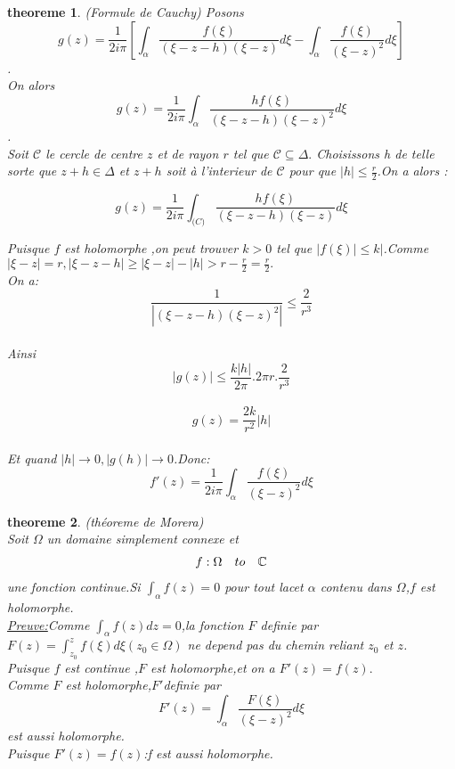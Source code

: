\documentclass[a4paper,12pt]{book}
\newtheorem{theoreme}{theoreme}[section]
\begin{document}
\begin{theoreme}{(Formule de Cauchy)}
			Posons $$g(z)=\frac{1}{2i\pi}[\int_{\alpha}\frac{f(\xi)}{(\xi -z-h)(\xi -z)}d\xi -\int_{\alpha}\frac{f(\xi)}{(\xi -z)^2}d\xi]$$.\\On alors $$g(z)=\frac{1}{2i\pi}\int_{\alpha}\frac{hf(\xi)}{(\xi -z -h)(\xi-z)^2}d\xi$$.\\Soit $\mathcal{C}$ le cercle de centre $z$ et de rayon $r$ tel que $\mathcal{C}\subseteq \Delta.$ Choisissons h de telle sorte que $z+h \in \Delta$ et $z+h$ soit à l'interieur de $\mathcal{C}$ pour que $ |h|\le \frac{r}{2}$.On a alors :
			\begin{center}
				$$g(z)=\frac{1}{2i\pi}\int_{\mathcal(C)}\frac{hf(\xi)}{(\xi -z -h)(\xi -z)}d\xi$$
			\end{center}Puisque $f$ est holomorphe ,on peut trouver $k>0$ tel que $ |f(\xi)|\le k|$.Comme $|\xi-z|=r,|\xi-z-h|\ge|\xi -z|-|h|>r-\frac{r}{2}=\frac{r}{2}.$\\On a:$$\frac{1}{|(\xi-z-h)(\xi-z)^2|}\le \frac{2}{r^3}$$\\Ainsi $$|g(z)|\le \frac{k|h|}{2\pi}.2\pi r .\frac{2}{r^3}$$\\
	$$g(z)=\frac{2k}{r^2}|h|$$\\Et quand $|h| \to 0,|g(h)| \to 0$.Donc:\\$$f'(z)=\frac{1}{2i\pi}\int_{\alpha}\frac{f(\xi)}{(\xi -z)^2}d\xi$$		
\end{theoreme}
\begin{theoreme}{(théoreme de Morera)}\\
	Soit $\Omega$ un domaine simplement connexe et
	\[
	\begin{array}{r c l}
		f:\Omega & to & \mathbb{C}\\
	\end{array}\]une fonction continue.Si $\int_{\alpha}f(z)=0$
pour tout lacet $\alpha$ contenu dans $\Omega$,$f$ est holomorphe.\\
\underline{Preuve:}Comme $\int_{\alpha}f(z)dz=0$,la fonction $F$ definie par $F(z)=\int_{z_0}^{z}f(\xi)d\xi(z_0 \in \Omega)$ ne depend pas du chemin reliant $z_0$ et $z$.\\Puisque
$ f$ est continue ,$F$ est holomorphe,et on a $F'(z)=f(z).$\\
Comme $F$ est holomorphe,$F'$definie par $$F'(z)=\int_{\alpha}\frac{F(\xi)}{(\xi -z)^2}d\xi$$ est aussi holomorphe. \\Puisque $F'(z)=f(z)$:f est aussi holomorphe.
       
\end{theoreme}
    
     
\end{document}
